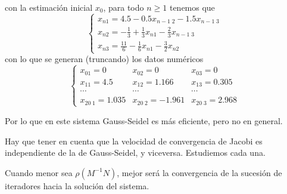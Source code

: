 \begin{ejemplo}
\begin{nlist}
	con la estimación inicial $x_0$, para todo $n \geq 1$ tenemos que
	\[ \left\{ \begin{array}{c}
	x_{n1} = 4.5 - 0.5x_{n-1 \; 2} - 1.5x_{n-1 \; 3} \\
	x_{n2} = - \frac{1}{3} + \frac{1}{3} x_{n1} - \frac{2}{3} x_{n-1 \; 3} \\
	x_{n3} = \frac{11}{6} - \frac{1}{6} x_{n1} - \frac{3}{2} x_{n2}
	\end{array}
	\right. \]
	con lo que se generan (truncando) los datos numéricos
	\[
	\left\{ \begin{array}{lll}
	x_{01} = 0 & x_{02} = 0 & x_{03} = 0 \\
	x_{11} = 4.5 & x_{12} = 1.166 & x_{13} = 0.305 \\
	\cdots & \cdots & \cdots \\
	x_{20 \; 1} = 1.035 & x_{20 \; 2} = -1.961 & x_{20 \; 3} = 2.968
	\end{array}
	\right.
	\]	
	\end{nlist}
Por lo que en este sistema Gauss-Seidel es más eficiente, pero no en general.
\end{ejemplo}

Hay que tener en cuenta que la velocidad de convergencia de Jacobi es independiente de la de Gauss-Seidel, y viceversa. Estudiemos cada una.

\begin{nprop}
Cuando menor sea $\rho (M^{-1}N)$, mejor será la convergencia de la sucesión de iteradores hacia la solución del sistema.
\end{nprop}

